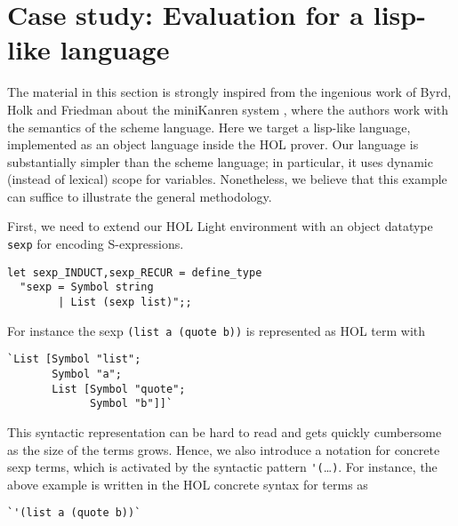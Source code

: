 

\section{Case study: Evaluation for a lisp-like language}
\label{sec:lisp-eval}

The material in this section is strongly inspired from the ingenious
work of Byrd, Holk and Friedman about the miniKanren system
\citep{Byrd:2012:MLU:2661103.2661105}, where the authors work with the
semantics of the scheme language.  Here we target a lisp-like
language, implemented as an object language inside the HOL prover.
Our language is substantially simpler than the scheme language; in
particular, it uses dynamic (instead of lexical) scope for variables.
Nonetheless, we believe that this example can suffice to illustrate
the general methodology.

First, we need to extend our HOL Light environment with an object
datatype \verb|sexp| for encoding S-expressions.
\begin{verbatim}
let sexp_INDUCT,sexp_RECUR = define_type
  "sexp = Symbol string
        | List (sexp list)";;
\end{verbatim}
For instance the sexp \verb|(list a (quote b))| is represented as HOL
term with
\begin{verbatim}
`List [Symbol "list";
       Symbol "a";
       List [Symbol "quote";
             Symbol "b"]]`
\end{verbatim}
This syntactic representation can be hard to read and gets quickly
cumbersome as the size of the terms grows.  Hence, we also introduce a
notation for concrete sexp terms, which is activated by the syntactic
pattern \verb|'(|\ldots\verb|)|.  For instance, the above example
is written in the HOL concrete syntax for terms as
\begin{verbatim}
`'(list a (quote b))`
\end{verbatim}

